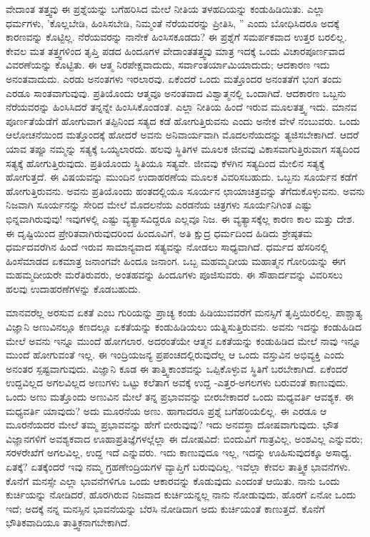 ವೇದಾಂತ ತತ್ತ್ವವು ಈ ಪ್ರಶ್ನೆಯನ್ನು ಬಗೆಹರಿಸಿದ ಮೇಲೆ ನೀತಿಯ ತಳಹದಿಯನ್ನು ಕಂಡುಹಿಡಿಯಿತು. ಎಲ್ಲಾ ಧರ್ಮಗಳು, 'ಕೊಲ್ಲಬೇಡಿ, ಹಿಂಸಿಸಬೇಡಿ, ನಿಮ್ಮಂತೆ ನೆರೆಯವರನ್ನು ಪ್ರೀತಿಸಿ, '' ಎಂದು ಬೋಧಿಸಿದರೂ ಅದಕ್ಕೆ ಕಾರಣವನ್ನು ಕೊಟ್ಟಿಲ್ಲ. ನೆರೆಯವರನ್ನು ನಾನೇಕೆ ಹಿಂಸಿಸಕೂಡದು? ಈ ಪ್ರಶ್ನೆಗೆ ಸಮರ್ಪಕವಾದ ಉತ್ತರ ಬರಲಿಲ್ಲ. ಕೇವಲ ಮತ ತತ್ತ್ವಗಳಿಂದ ತೃಪ್ತಿ ಪಡದ ಹಿಂದೂಗಳ ವೇದಾಂತತತ್ತ್ವವು ಮಾತ್ರ ಇದಕ್ಕೆ ಒಂದು ವಿಚಾರಪೂರ್ಣವಾದ ವಿವರಣೆಯನ್ನು ಕೊಟ್ಟಿತು. ಈ ಆತ್ಮ ನಿರಪೇಕ್ಷವಾದುದು, ಸರ್ವಾಂತರ್ಯಾಮಿಯಾದುದು; ಆದಕಾರಣ ಇದು ಅನಂತವಾದುದು. ಎರಡು ಅನಂತಗಳು ಇರಲಾರವು. ಏಕೆಂದರೆ ಒಂದು ಮತ್ತೊಂದರ ಅನಂತತೆಗೆ ಭಂಗ ತಂದು ಎರಡೂ ಸಾಂತವಾಗುವುವು. ಪ್ರತಿಯೊಂದು ಆತ್ಮವೂ ಅನಂತವಾದ ವಿಶ್ವಾತ್ಮನಲ್ಲಿ ಒಂದಾಗಿದೆ. ಆದಕಾರಣ ಒಬ್ಬನು ನೆರೆಯವರನ್ನು ಹಿಂಸಿಸಿದರೆ ತನ್ನನ್ನೇ ಹಿಂಸಿಸಿಕೊಂಡಂತೆ. ಎಲ್ಲಾ ನೀತಿಯ ಹಿಂದೆ ಇರುವ ಮೂಲತತ್ತ್ವ ಇದು. ಮಾನವ ಪೂರ್ಣತೆಯೆಡೆಗೆ ಹೋಗುವಾಗ ತಪ್ಪಿನಿಂದ ಸತ್ಯದ ಕಡೆ ಹೋಗುತ್ತಿರುವನು ಎಂದು ಅನೇಕ ವೇಳೆ ನಂಬುವರು. ಒಂದು ಆಲೋಚನೆಯಿಂದ ಮತ್ತೊಂದಕ್ಕೆ ಹೋದರೆ ಅವನು ಅನಿವಾರ್ಯವಾಗಿ ಮೊದಲನೆಯದನ್ನು ತ್ಯಜಿಸಬೇಕಾಗಿದೆ. ಆದರೆ ಯಾವ ತಪ್ಪೂ ನಮ್ಮನ್ನು ಸತ್ಯಕ್ಕೆ ಒಯ್ಯಲಾರದು. ಹಲವು ಸ್ಥಿತಿಗಳ ಮೂಲಕ ಜೀವವು ವಿಕಾಸವಾಗುತ್ತಿರುವಾಗ ಸತ್ಯದಿಂದ ಸತ್ಯಕ್ಕೆ ಹೋಗುತ್ತಿರುವುದು. ಪ್ರತಿಯೊಂದು ಸ್ಥಿತಿಯೂ ಸತ್ಯವೇ. ಜೀವವು ಕೆಳಗಿನ ಸತ್ಯದಿಂದ ಮೇಲಿನ ಸತ್ಯಕ್ಕೆ ಹೋಗುತ್ತದೆ. ಈ ವಿಷಯವನ್ನು ಮುಂದಿನ ಉದಾಹರಣೆಯ ಮೂಲಕ ವಿವರಿಸಬಹುದು. ಒಬ್ಬನು ಸೂರ್ಯನ ಕಡೆಗೆ ಹೋಗುತ್ತಿರುವನು. ಅವನು ಪ್ರತಿಯೊಂದು ಹಂತದಲ್ಲಿಯೂ ಸೂರ್ಯನ ಛಾಯಾಚಿತ್ರವನ್ನು ತೆಗೆದುಕೊಳ್ಳುವನು. ಅವನು ನಿಜವಾಗಿ ಸೂರ್ಯನನ್ನು ಸೇರಿದ ಮೇಲೆ ಮೊದಲನೆಯ ಎರಡನೆಯ ಚಿತ್ರಗಳು ಸೂರ್ಯನಿಗಿಂತ ಎಷ್ಟು ಭಿನ್ನವಾಗಿರುವುವು! ಇವುಗಳಲ್ಲಿ ಎಷ್ಟು ವ್ಯತ್ಯಾಸವಿದ್ದರೂ ಎಲ್ಲವೂ ನಿಜ. ಈ ವ್ಯತ್ಯಾಸಕ್ಕೆಲ್ಲ ಕಾರಣ ಕಾಲ ಮತ್ತು ದೇಶ. ಈ ದೃಷ್ಟಿಯಿಂದ ಪ್ರೇರಿತವಾಗಿರುವುದರಿಂದ ಹಿಂದೂವಿಗೆ, ಅತಿ ಕ್ಷುದ್ರ ಧರ್ಮದಿಂದ ಹಿಡಿದು ಶ್ರೇಷ್ಠತಮ ಧರ್ಮದವರೆಗಿನ ಹಿಂದೆ ಇರುವ ಸಾಮಾನ್ಯವಾದ ಸತ್ಯವನ್ನು ನೋಡಲು ಸಾಧ್ಯವಾಗಿದೆ. ಧರ್ಮದ ಹೆಸರಿನಲ್ಲಿ ಹಿಂಸೆಮಾಡದ ಏಕಮಾತ್ರ ಜನಾಂಗವೇ ಹಿಂದೂ ಜನಾಂಗ. ಒಬ್ಬ ಮಹಮ್ಮದೀಯ ಮಹಾತ್ಮನ ಗೋರಿಯನ್ನು ಈಗ ಮಹಮ್ಮದೀಯರೇ ಮರೆತಿರುವರು, ಅಂತಹವನ್ನು ಹಿಂದೂಗಳು ಪೂಜಿಸುವರು. ಈ ಸೌಹಾರ್ದವನ್ನು ವಿವರಿಸಲು ಹಲವು ಉದಾಹರಣೆಗಳನ್ನು ಕೊಡಬಹುದು.

ಮಾನವರೆಲ್ಲ ಅರಸುವ ಏಕತೆ ಎಂಬ ಗುರಿಯನ್ನು ಪ್ರಾಚ್ಯ ಕಂಡು ಹಿಡಿಯುವವರೆಗೆ ಮನಸ್ಸಿಗೆ ತೃಪ್ತಿಯಿರಲಿಲ್ಲ. ಪಾಶ್ಚಾತ್ಯ ವಿಜ್ಞಾನಿ ಅಣುವಿನಲ್ಲೂ ಕಣದಲ್ಲೂ ಏಕತೆಯನ್ನು ಕಂಡುಹಿಡಿಯಲು ಯತ್ನಿಸುತ್ತಿರುವನು. ಅವನು ಇದನ್ನು ಕಂಡುಹಿಡಿದ ಮೇಲೆ ಅವನು ಇನ್ನೂ ಮುಂದೆ ಹೋಗಲಾರ. ಅದರಂತೆಯೇ ಆತ್ಮನ ಏಕತೆಯನ್ನು ಕಂಡುಹಿಡಿದ ಮೇಲೆ ನಾವು ಇನ್ನೂ ಮುಂದೆ ಹೋಗುವಂತೆ ಇಲ್ಲ. ಈ ಇಂದ್ರಿಯಜನ್ಯ ಪ್ರಪಂಚದಲ್ಲಿರುವುದೆಲ್ಲ ಆ ಒಂದು ವಸ್ತುವಿನ ಅಭಿವ್ಯಕ್ತಿ ಎಂದು ಅನಂತರ ಸ್ಪಷ್ಟವಾಗುವುದು. ವಿಜ್ಞಾನಿ ಕೂಡ ಈ ತಾತ್ತ್ವಿಕಾಂಶವನ್ನು ಒಪ್ಪಿಕೊಳ್ಳುವ ಸ್ಥಿತಿಗೆ ಬರಬೇಕಾಗಿದೆ. ಏಕೆಂದರೆ ಉದ್ದವಿಲ್ಲದ ಅಗಲವಿಲ್ಲದ ಅಣುಗಳು ಒಟ್ಟು ಕಲೆತಾಗ ಅವಕ್ಕೆ ಉದ್ದ -ಎತ್ತರ-ಅಗಲಗಳು ಬರುವಂತೆ ಕಾಣುವುದು. ಒಂದು ಅಣು ಮತ್ತೊಂದು ಅಣುವಿನ ಮೇಲೆ ತನ್ನ ಪ್ರಭಾವವನ್ನು ಬೀರಬೇಕಾದರೆ ಒಂದು ಮಧ್ಯವರ್ತಿ ಆವಶ್ಯಕ. ಈ ಮಧ್ಯವರ್ತಿ ಯಾವುದು? ಅದು ಮೂರನೆಯ ಅಣು. ಹಾಗಾದರೂ ಪ್ರಶ್ನೆ ಬಗೆಹರಿಯಲಿಲ್ಲ. ಈ ಎರಡೂ ಆ ಮೂರನೆಯದರ ಮೇಲೆ ತಮ್ಮ ಪ್ರಭಾವವನ್ನು ಹೇಗೆ ಬೀರುವುವು? ಇದು ಅನವಸ್ಥಾ ದೋಷವಾಗುವುದು. ಭೌತ ವಿಜ್ಞಾನಗಳಿಗೆ ಅವಶ್ಯಕವಾದ ಊಹಾಪ್ರತಿಜ್ಞೆಗಳಲ್ಲೆಲ್ಲಾ ಈ ದೋಷವಿದೆ: ಬಿಂದುವಿಗೆ ಗಾತ್ರವಿಲ್ಲ, ಅಂಶವಿಲ್ಲ ಎನ್ನುವರು; ಸರಳರೇಖೆಗೆ ಅಗಲವಿಲ್ಲ, ಉದ್ದ ಇದೆ ಎನ್ನುವರು. ಇದು ಕಾಣುವುದೂ ಇಲ್ಲ, ಇದನ್ನು ಊಹಿಸುವುದಕ್ಕೂ ಅಸಾಧ್ಯ. ಏತಕ್ಕೆ? ಏತಕ್ಕೆಂದರೆ ಇವು ನಮ್ಮ ಗ್ರಹಣೇಂದ್ರಿಯಗಳ ವ್ಯಾಪ್ತಿಗೆ ಬರುವುದಿಲ್ಲ. ಇವೆಲ್ಲಾ ಕೇವಲ ತಾತ್ತ್ವಿಕ ಭಾವನೆಗಳು. ಕೊನೆಗೆ ಮನಸ್ಸೇ ಎಲ್ಲಾ ಭಾವನೆಗಳಿಗೂ ಒಂದು ಆಕಾರವನ್ನು ಕೊಡುವುದು ಎಂದಂತೆ ಆಯಿತು. ನಾನು ಒಂದು ಕುರ್ಚಿಯನ್ನು ನೋಡಿದರೆ, ಹೊರಗಿರುವ ನಿಜವಾದ ಕುರ್ಚಿಯನ್ನಲ್ಲ ನಾನು ನೋಡುವುದು, ಹೊರಗೆ ಏನೋ ಒಂದು ಇದೆ; ಅದಕ್ಕೆ ನನ್ನ ಮನಸ್ಸಿನ ಭಾವನೆಯನ್ನು ಬೆರಸಿ ನೋಡಿದಾಗ ಅದು ಕುರ್ಚಿಯಂತೆ ಕಾಣುತ್ತದೆ. ಕೊನೆಗೆ ಭೌತಿಕವಾದಿಯೂ ತಾತ್ತ್ವಿಕನಾಗಬೇಕಾಗಿದೆ.

